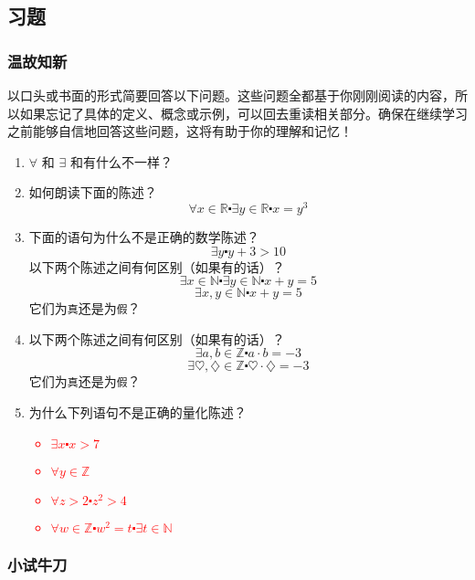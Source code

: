 \subsection{习题}

\subsubsection*{温故知新}

以口头或书面的形式简要回答以下问题。这些问题全都基于你刚刚阅读的内容，所以如果忘记了具体的定义、概念或示例，可以回去重读相关部分。确保在继续学习之前能够自信地回答这些问题，这将有助于你的理解和记忆！

\begin{enumerate}[label=(\arabic*)]
    \item $\forall$ 和 $\exists$ 和有什么不一样？
    \item 如何朗读下面的陈述？
        \[\forall x \in \mathbb{R} \centerdot \exists y \in \mathbb{R} \centerdot x = y^3\]
    \item 下面的语句为什么不是正确的数学陈述？
        \[\exists y \centerdot y + 3 > 10\]
        以下两个陈述之间有何区别（如果有的话）？
        \[\exists x \in \mathbb{N} \centerdot \exists y \in \mathbb{N} \centerdot x + y = 5\]
        \[\exists x, y \in \mathbb{N} \centerdot x + y = 5\]
        它们为\verb|真|还是为\verb|假|？
    \item 以下两个陈述之间有何区别（如果有的话）？
        \[\exists a, b \in \mathbb{Z} \centerdot a \cdot b = -3\]
        \[\exists \heartsuit, \diamondsuit \in \mathbb{Z} \centerdot \heartsuit \cdot \diamondsuit = -3\]
        它们为\verb|真|还是为\verb|假|？
    \item 为什么下列语句不是正确的量化陈述？
        \textcolor{red}{\begin{itemize}
            \item $\exists x \centerdot x > 7$
            \item $\forall y \in \mathbb{Z}$
            \item $\forall z > 2 \centerdot z^2 > 4$
            \item $\forall w \in \mathbb{Z} \centerdot w^2 = t \centerdot \exists t \in \mathbb{N}$
        \end{itemize}}
\end{enumerate}

\subsubsection*{小试牛刀}

